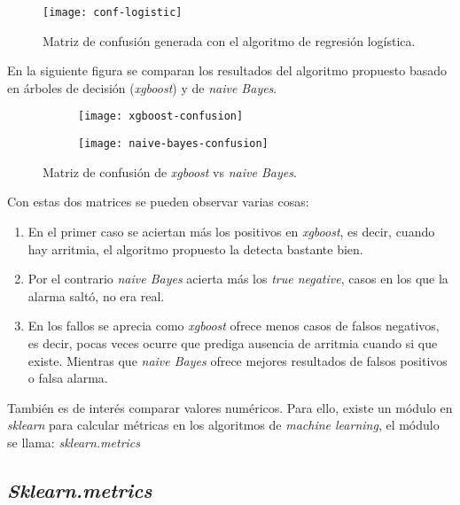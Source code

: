\begin{figure}[h]
	\centering
	\texttt{[image: conf-logistic]}
	\caption{Matriz de confusión generada con el algoritmo de regresión logística.}
	\label{fig:conf_lr}
\end{figure}

En la siguiente figura se comparan los resultados del algoritmo propuesto basado en árboles de decisión (\textit{xgboost}) y de \textit{naive Bayes}.

\begin{figure}[!tbp]
	\begin{subfigure}[b]{0.49\textwidth}
		\texttt{[image: xgboost-confusion]}
		\label{fig:f1}
	\end{subfigure}
	\hfill
	\begin{subfigure}[b]{0.49\textwidth}
		\texttt{[image: naive-bayes-confusion]}
		\label{fig:f2}
	\end{subfigure}
	\caption{Matriz de confusión de \textit{xgboost} vs \textit{naive Bayes}.}
\end{figure}

Con estas dos matrices se pueden observar varias cosas:
\begin{enumerate}
	\item En el primer caso se aciertan más los positivos en \textit{xgboost}, es decir, cuando hay arritmia, el algoritmo propuesto la detecta bastante bien.
	\item Por el contrario \textit{naive Bayes} acierta más los \textit{true negative}, casos en los que la alarma saltó, no era real.
	\item En los fallos se aprecia como \textit{xgboost} ofrece menos casos de falsos negativos, es decir, pocas veces ocurre que prediga ausencia de arritmia cuando si que existe.
	Mientras que \textit{naive Bayes} ofrece mejores resultados de falsos positivos o falsa alarma.
\end{enumerate} 
 

También es de interés comparar valores numéricos. Para ello, existe un módulo en \textit{sklearn} para calcular métricas en los algoritmos de \textit{machine learning}, el módulo se llama: \textit{sklearn.metrics}

\clearpage
\subsection{\textit{Sklearn.metrics}}

